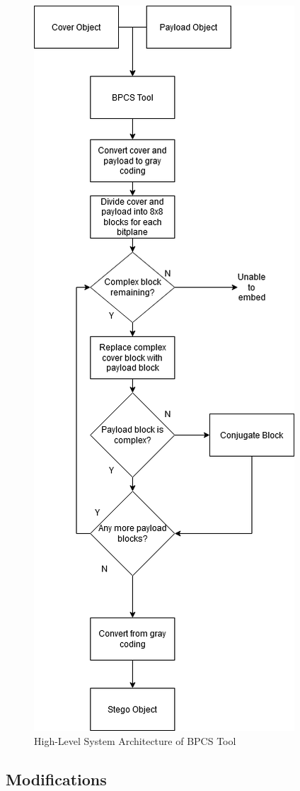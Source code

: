 \documentclass{l4proj}
\begin{document}
\begin{figure}[]
    \centering
    \includegraphics[width=0.6\linewidth]{images/bpcs_architecture.png}    
    \caption{High-Level System Architecture of BPCS Tool}
    \label{fig:hlsa_bpcs} 
\end{figure}

\subsection{Modifications}\label{modifications_design}
\end{document}
